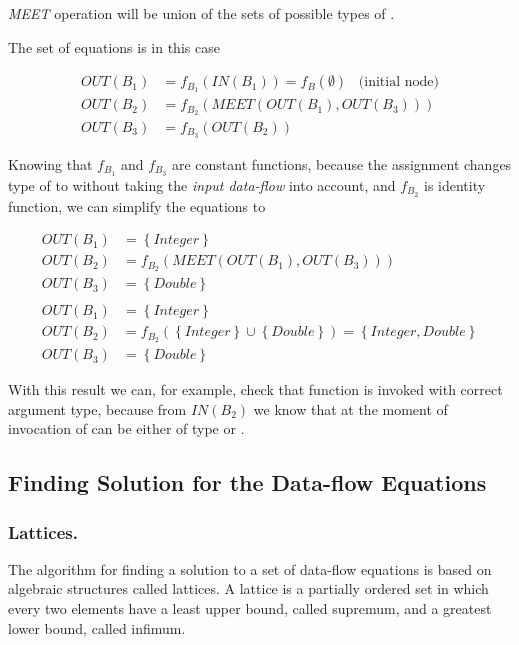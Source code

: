         \emph{MEET} operation will be union of the sets of 
        possible types of .
        
        The set of equations is in this case
        
        \begin{align*}
            OUT(B_1) &= f_{B_1}(IN(B_1))=f_B(\emptyset) \,\,\,\,\,\text{(initial node)} \\
            OUT(B_2) &= f_{B_2}(\mathit{MEET}(OUT(B_1), OUT(B_3))) \\
            OUT(B_3) &= f_{B_3}(OUT(B_2))     
        \end{align*}
        
        Knowing that $f_{B_1}$ and $f_{B_3}$ are constant functions, because 
        the assignment changes type of  to  without taking 
        the \emph{input data-flow} into account, and $f_{B_2}$ is identity 
        function, we can simplify the equations to

        \begin{align*}
            OUT(B_1) &= \left\{ \mathit{Integer} \right\} \\
            OUT(B_2) &= f_{B_2}(\mathit{MEET}(OUT(B_1), OUT(B_3))) \\
            OUT(B_3) &= \left\{ \mathit{Double} \right\} \\
            \\
            OUT(B_1) &= \left\{ \mathit{Integer} \right\} \\
            OUT(B_2) &= f_{B_2}( \left\{ \mathit{Integer} \right\} \cup \left\{ \mathit{Double} \right\} ) = 
                \left\{ \mathit{Integer}, \mathit{Double} \right\} \\
            OUT(B_3) &= \left\{ \mathit{Double} \right\}
        \end{align*}
        
        With this result we can, for example, check that function  
        is invoked with correct argument type, because from $IN(B_2)$ we 
        know that  at the moment of invocation of  
        can be either of type  or .
                
        \subsection{Finding Solution for the Data-flow Equations}
        
        \subsubsection*{Lattices.}
        The algorithm for finding a solution to a set of data-flow 
        equations is based on algebraic structures called lattices. 
        A lattice is a partially ordered set in which every 
        two elements have a least upper bound, called supremum, 
        and a greatest lower bound, called infimum.
        
